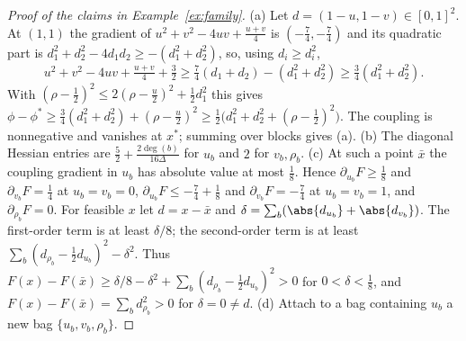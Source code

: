 \begin{proof}[Proof of the claims in Example~\ref{ex:family}]
(a) Let $d=(1-u,1-v)\in[0,1]^2$. At $(1,1)$ the gradient of
$u^2+v^2-4uv+\frac{u+v}4$ is $(-\frac74,-\frac74)$ and its quadratic part is
$d_1^2+d_2^2-4d_1d_2\ge-(d_1^2+d_2^2)$, so, using $d_i\ge d_i^2$,
\[
u^2+v^2-4uv+\tfrac{u+v}4+\tfrac32\ge\tfrac74(d_1+d_2)-(d_1^2+d_2^2)
\ge\tfrac34(d_1^2+d_2^2).
\]
With $(\rho-\frac12)^2\le2(\rho-\frac u2)^2+\frac12d_1^2$ this gives
$\phi-\phi^*\ge\frac34(d_1^2+d_2^2)+(\rho-\frac u2)^2\ge\frac12\bigl(d_1^2+d_2^2
+(\rho-\frac12)^2\bigr)$. The coupling is nonnegative and vanishes at $x^*$;
summing over blocks gives (a). (b) The diagonal Hessian entries are
$\frac52+\frac{2\deg(b)}{16\Delta}$ for $u_b$ and $2$ for $v_b,\rho_b$.
(c) At such a point $\bar x$ the coupling gradient in $u_b$ has absolute value at
most $\frac18$. Hence $\partial_{u_b}F\ge\frac18$ and $\partial_{v_b}F=\frac14$ at
$u_b=v_b=0$, $\partial_{u_b}F\le-\frac74+\frac18$ and $\partial_{v_b}F=-\frac74$ at
$u_b=v_b=1$, and $\partial_{\rho_b}F=0$. For feasible $x$ let $d=x-\bar x$ and
$\delta=\sum_b(\abs{d_{u_b}}+\abs{d_{v_b}})$. The first-order term is at least
$\delta/8$; the second-order term is at least
$\sum_b(d_{\rho_b}-\frac12d_{u_b})^2-\delta^2$. Thus
$F(x)-F(\bar x)\ge\delta/8-\delta^2+\sum_b(d_{\rho_b}-\frac12d_{u_b})^2>0$ for
$0<\delta<\frac18$, and $F(x)-F(\bar x)=\sum_bd_{\rho_b}^2>0$ for $\delta=0\ne d$.
(d) Attach to a bag containing $u_b$ a new bag $\{u_b,v_b,\rho_b\}$.
\end{proof}

